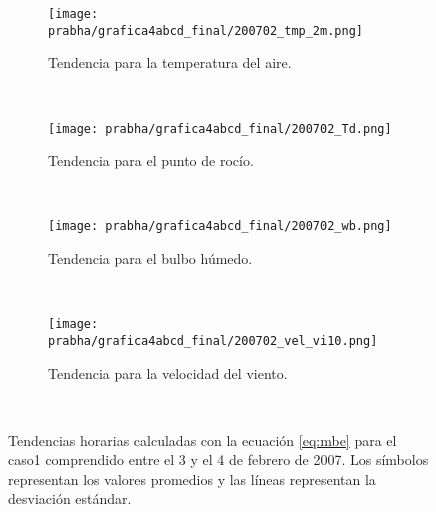 \begin{figure}[H]
    \centering
    \begin{subfigure}[b]{0.45\textwidth}
        \caption{Tendencia para la temperatura del aire.}
	\texttt{[image: prabha/grafica4abcd\_final/200702\_tmp\_2m.png]}
    \label{subfig:tmp_0_caso1}
	\end{subfigure}
	~
	    \begin{subfigure}[b]{0.45\textwidth}
	        \caption{Tendencia para el punto de rocío.}
	\texttt{[image: prabha/grafica4abcd\_final/200702\_Td.png]}

    \label{subfig:td_caso1}
	\end{subfigure}
	~
	    \begin{subfigure}[b]{0.45\textwidth}
	\caption{Tendencia para el bulbo húmedo.}
	\texttt{[image: prabha/grafica4abcd\_final/200702\_wb.png]}
    \label{subfig:wb_caso1}
	\end{subfigure}
	~
	    \begin{subfigure}[b]{0.45\textwidth}
	\caption{Tendencia para la velocidad del viento.}	
	\texttt{[image: prabha/grafica4abcd\_final/200702\_vel\_vi10.png]}
    
    \label{subfig:vel_caso1}
	\end{subfigure}
	~

\caption{Tendencias horarias calculadas con la ecuación \ref{eq:mbe} para el caso1 comprendido entre el 3 y el 4 de febrero de 2007. Los símbolos representan los valores promedios y las líneas representan la desviación estándar.}	
\label{subfig:mbe_caso1}	
\end{figure}


